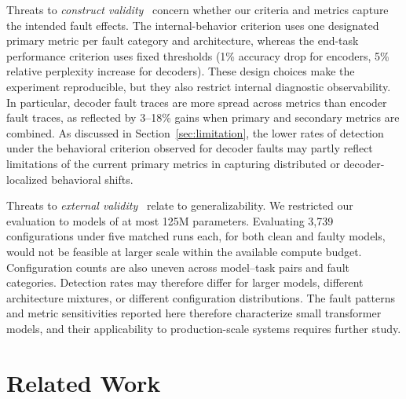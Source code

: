 Threats to \emph{construct validity}~\cite{smith2005construct} concern whether our criteria and metrics capture the intended fault effects. The internal-behavior criterion uses one designated primary metric per fault category and architecture, whereas the end-task performance criterion uses fixed thresholds (1\% accuracy drop for encoders, 5\% relative perplexity increase for decoders). These design choices make the experiment reproducible, but they also restrict internal diagnostic observability. In particular, decoder fault traces are more spread across metrics than encoder fault traces, as reflected by 3--18\% gains when primary and secondary metrics are combined. As discussed in Section~\ref{sec:limitation}, the lower rates of detection under the behavioral criterion observed for decoder faults may partly reflect limitations of the current primary metrics in capturing distributed or decoder-localized behavioral shifts.

Threats to \emph{external validity}~\cite{findley2021external} relate to generalizability. We restricted our evaluation to models of at most 125M parameters. Evaluating 3{,}739 configurations under five matched runs each, for both clean and faulty models, would not be feasible at larger scale within the available compute budget. Configuration counts are also uneven across model--task pairs and fault categories. Detection rates may therefore differ for larger models, different architecture mixtures, or different configuration distributions. The fault patterns and metric sensitivities reported here therefore characterize small transformer models, and their applicability to production-scale systems requires further study.

\section{Related Work}
\label{sec:related-work}

